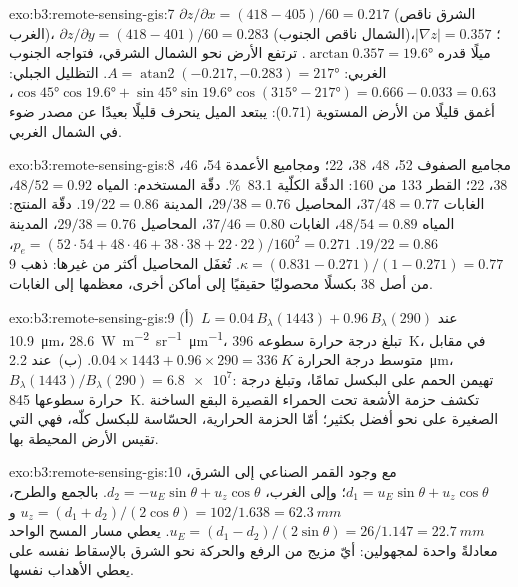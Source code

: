 \begin{solution}{exo:b3:remote-sensing-gis:7}
$\partial z/\partial x = (418 - 405)/60 = 0.217$ (الشرق ناقص الغرب)،
$\partial z/\partial y = (418 - 401)/60 = 0.283$ (الشمال ناقص الجنوب)؛
$|\nabla z| = 0.357$، ميلًا قدره $\arctan 0.357 = \ang{19.6}$. ترتفع الأرض
نحو الشمال الشرقي، فتواجه الجنوب الغربي: $A =
\operatorname{atan2}(-0.217, -0.283) = \ang{217}$. التظليل الجبلي: $\cos\ang{45}
\cos\ang{19.6} + \sin\ang{45}\sin\ang{19.6}\cos(\ang{315} - \ang{217}) =
0.666 - 0.033 = 0.63$، أغمق قليلًا من الأرض المستوية (0.71): يبتعد الميل
ينحرف قليلًا بعيدًا عن مصدر ضوء في الشمال الغربي.
\end{solution}

\begin{solution}{exo:b3:remote-sensing-gis:8}
مجاميع الصفوف 52، 48، 38، 22؛ ومجاميع الأعمدة 54، 46، 38، 22؛ القطر 133 من
160: الدقّة الكلّية \qty{83.1}{\percent}. دقّة المستخدم: المياه
$48/52 = 0.92$، الغابات $37/48 = 0.77$، المحاصيل $29/38 = 0.76$، المدينة
$19/22 = 0.86$. دقّة المنتج: المياه $48/54 = 0.89$، الغابات $37/46 = 0.80$،
المحاصيل $29/38 = 0.76$، المدينة $19/22 = 0.86$. $p_e = (52\cdot54 + 48\cdot46 +
38\cdot38 + 22\cdot22)/160^2 = 0.271$، $\kappa = (0.831 - 0.271)/(1 -
0.271) = 0.77$. تُغفَل المحاصيل أكثر من غيرها: ذهب 9 من أصل 38 بكسلًا
محصوليًا حقيقيًا إلى أماكن أخرى، معظمها إلى الغابات.
\end{solution}

\begin{solution}{exo:b3:remote-sensing-gis:9}
(أ)~$L = 0.04\,B_\lambda(1443) + 0.96\,B_\lambda(290)$ عند
\qty{10.9}{\micro\metre}، \qty{28.6}{W.m^{-2}.sr^{-1}.\micro\metre^{-1}}،
تبلغ درجة حرارة سطوعه \qty{396}{K}، في مقابل متوسط درجة الحرارة
$0.04\times1443 + 0.96\times290 = \qty{336}{K}$. (ب)~عند
\qty{2.2}{\micro\metre}، $B_\lambda(1443)/B_\lambda(290) = \num{6.8e7}$:
تهيمن الحمم على البكسل تمامًا، وتبلغ درجة حرارة سطوعها
\qty{845}{K}. تكشف حزمة الأشعة تحت الحمراء القصيرة البقع الساخنة الصغيرة
على نحو أفضل بكثير؛ أمّا الحزمة الحرارية، الحسّاسة للبكسل كلّه، فهي التي
تقيس الأرض المحيطة بها.
\end{solution}

\begin{solution}{exo:b3:remote-sensing-gis:10}
مع وجود القمر الصناعي إلى الشرق، $d_1 = u_E\sin\theta + u_z\cos\theta$؛ وإلى
الغرب، $d_2 = -u_E\sin\theta + u_z\cos\theta$. بالجمع والطرح،
$u_z = (d_1 + d_2)/(2\cos\theta) = 102/1.638 = \qty{62.3}{mm}$ و$u_E =
(d_1 - d_2)/(2\sin\theta) = 26/1.147 = \qty{22.7}{mm}$. يعطي مسار المسح الواحد معادلةً واحدة
لمجهولين: أيّ مزيج من الرفع والحركة نحو الشرق بالإسقاط نفسه على 
يعطي الأهداب نفسها.
\end{solution}


